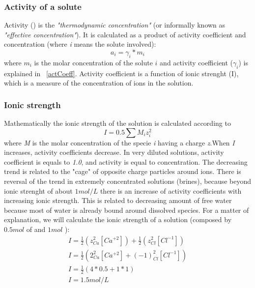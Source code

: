 

\subsubsection{Activity of a solute}\label{activity}
Activity () is the \emph{"thermodynamic concentration"} (or informally known as \emph{"effective concentration"}). It is calculated as a product of activity coefficient and concentration (where \emph{i} means the solute involved):
\begin{equation}\label{activityEq}
a_i = \gamma_i * m_i
\end{equation}
where $m_i$ is the molar concentration of the solute $i$ and activity coefficient ($\gamma_i$) is explained in ~\ref{actCoeff}. Activity coefficient is a function of ionic strenght (I), which is a measure of the concentration of ions in the solution.  

\subsubsection{Ionic strength}
Mathematically the ionic strength of the solution is calculated according to
\begin{equation} \label{eq:ionicStrength}
I = 0.5 \sum{M_i z_i^2}
\end{equation}
where \emph{M} is the molar concentration of the specie \emph{i} having a charge \emph{z}.When \emph{I} increases, activity coefficients decrease. In very diluted solutions, activity coefficient is equals to \emph{1.0}, and activity is equal to concentration. The decreasing trend is related to the "cage" of opposite charge particles around ions. There is reversal of the trend in extremely concentrated solutions (brines), because beyond ionic strenght of about $1 mol/L$ there is an increase of activity coefficients with increasing ionic strength. This is related to decreasing amount of free water because most of water is already bound around dissolved species.
For a matter of explanation, we will calculate the ionic strength of a  solution (composed by $0.5 mol$ of  and $1 mol$ ):
\begin{eqnarray}
I = \frac{1}{2}  (z^2_{Ca}[Ca^{+2}]) + \frac{1}{2}  (z^2_{Cl}[Cl^{-1}]) \\
I = \frac{1}{2}  (2^2_{Ca}[Ca^{+2}] +  (-1)^2_{Cl}[Cl^{-1}]) \\
I = \frac{1}{2} (4 * 0.5 + 1 * 1) \\
I = 1.5 mol/L
\end{eqnarray}


